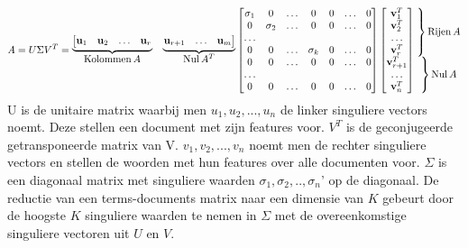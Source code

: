 \[
   A= U\Sigma V^T=
  \begin{matrix}
    \underbrace{\left[\begin{matrix}\vect u_1 & \vect u_2 & \dots & \vect u_r\end{matrix}\right.}& 
    \underbrace{\left.\begin{matrix}\vect u_{r+1} & \dots &  \vect u_m\end{matrix}\right]}\\
    \col A & \nul A^T
  \end{matrix}
  \begin{bmatrix}
      \sigma_1 & 0 & \dots & 0 & 0 & \dots & 0 \\
         0 & \sigma_2  & \dots & 0 & 0 & \dots & 0 \\
         \dots& & & & &  \\
         0 & 0 & \dots & \sigma_k  & 0 & \dots & 0 \\
         0 & 0 & \dots & 0 & 0 & \dots & 0 \\
         \dots& & & & &  \\
         0 & 0 & \dots & 0 & 0 & \dots & 0 
  \end{bmatrix}
  \begin{bmatrix}
    \vect v_1^T \\ \vect v_2^T \\ \dots \\ \vect v_r^T \\
    \vect v_{r+1}^T \\ \dots \\ \vect v_n^T
  \end{bmatrix}
  \begin{matrix}
    \left.\vphantom{\begin{bmatrix}
       \vect v_1^T \\ \vect v_2^T \\ \dots \\ \vect v_r^T 
       \end{bmatrix}}\right\}\row A \\ 
    \left.\vphantom{\begin{bmatrix}
      \vect v_{r+1}^T \\ \dots \\ \vect v_n^T 
    \end{bmatrix}}\right\}\nul A
  \end{matrix}
\] 
\newline
U is de unitaire matrix waarbij men $u_1, u_2, ... , u_n$ de linker singuliere vectors noemt. Deze stellen een document met zijn features voor. $V^T$ is de geconjugeerde getransponeerde matrix van V. $v_1, v_2, ... , v_n$ noemt men de rechter singuliere vectors en stellen de woorden met hun features over alle documenten voor. $\Sigma$ is een diagonaal matrix met singuliere waarden $\sigma_1,\sigma_2,..,\sigma_n$'  op de diagonaal. De reductie van een terms-documents matrix naar een dimensie van $K$ gebeurt door de hoogste $K$ singuliere waarden te nemen in $\Sigma$ met de overeenkomstige singuliere vectoren uit $U$ en $V$.    
